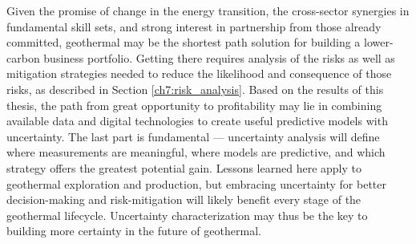 Given the promise of change in the energy transition, the cross-sector synergies in fundamental skill sets, and strong interest in partnership from those already committed, geothermal may be the shortest path solution for building a lower-carbon business portfolio. Getting there requires analysis of the risks as well as mitigation strategies needed to reduce the likelihood and consequence of those risks, as described in Section \ref{ch7:risk_analysis}. Based on the results of this thesis, the path from great opportunity to profitability may lie in combining available data and digital technologies to create useful predictive models with uncertainty. The last part is fundamental --- uncertainty analysis will define where measurements are meaningful, where models are predictive, and which strategy offers the greatest potential gain. Lessons learned here apply to geothermal exploration and production, but embracing uncertainty for better decision-making and risk-mitigation will likely benefit every stage of the geothermal lifecycle. Uncertainty characterization may thus be the key to building more certainty in the future of geothermal.